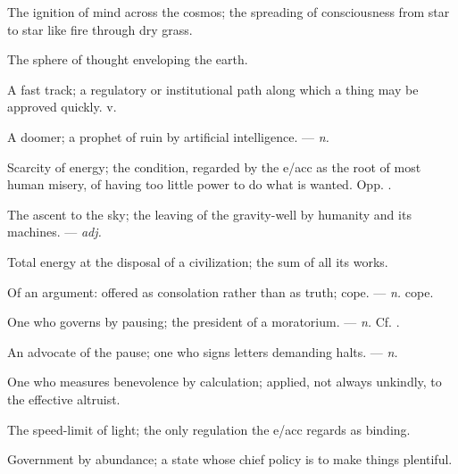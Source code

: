  The ignition of mind across the cosmos; the spreading of consciousness from star to star like fire through dry grass.

 The sphere of thought enveloping the earth.

 A fast track; a regulatory or institutional path along which a thing may be approved quickly.   v.

 A doomer; a prophet of ruin by artificial intelligence. ---  \textit{n.}

 Scarcity of energy; the condition, regarded by the e/acc as the root of most human misery, of having too little power to do what is wanted. Opp. .

 The ascent to the sky; the leaving of the gravity-well by humanity and its machines. ---  \textit{adj.}

 Total energy at the disposal of a civilization; the sum of all its works.

 Of an argument: offered as consolation rather than as truth;  cope. ---  \textit{n.} cope.

 One who governs by pausing; the president of a moratorium. ---  \textit{n.} Cf. .

 An advocate of the pause; one who signs letters demanding halts. ---  \textit{n.}

 One who measures benevolence by calculation; applied, not always unkindly, to the effective altruist.

 The speed-limit of light; the only regulation the e/acc regards as binding.

 Government by abundance; a state whose chief policy is to make things plentiful.

